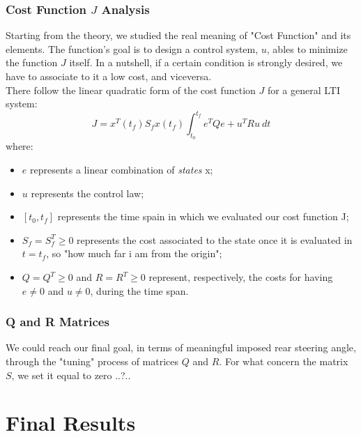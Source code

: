 \documentclass[a4paper,12pt,titlepage]{report}
\begin{document}
	\subsection{Cost Function $J$ Analysis}
		Starting from the theory, we studied the real meaning of "Cost Function" and its elements. The function's goal is to design a control system, $u$, ables to minimize the function $J$ itself. In a nutshell, if a certain condition is strongly desired, we have to associate to it a low cost, and viceversa. \\
		There follow the linear quadratic form of the cost function $J$ for a general LTI system:
			\begin{equation}
				J = x^{T}(t_{f}) S_{f} x(t_{f})\int_{t_{0}}^{t_{f}} e^{T} Q e + u^{T} R u \ dt
			\end{equation}
		where:
			\begin{itemize}
				\item $e$ represents a linear combination of \textit{states} x;
				\item $u$ represents the control law;
				\item $ [t_{0},t_{f}] $ represents the time spain in which we evaluated our cost function J;
				\item $ S_{f} = S_{f}^{T} \geq0 $ represents the cost associated to the state once it is evaluated in $t=t_{f}$, so "how much far i am from the origin";
				\item $ Q=Q^{T}\geq 0 $ and $ R=R^{T}\geq 0 $ represent, respectively, the costs for having $e\neq0$ and $u\neq0$, during the time span.
			\end{itemize}
	\subsection{Q and R Matrices}
		We could reach our final goal, in terms of meaningful imposed rear steering angle, through the "tuning" process of matrices $Q$ and $R$. For what concern the matrix $S$, we set it equal to zero ..?..	
		
\chapter{Final Results}
\end{document}
